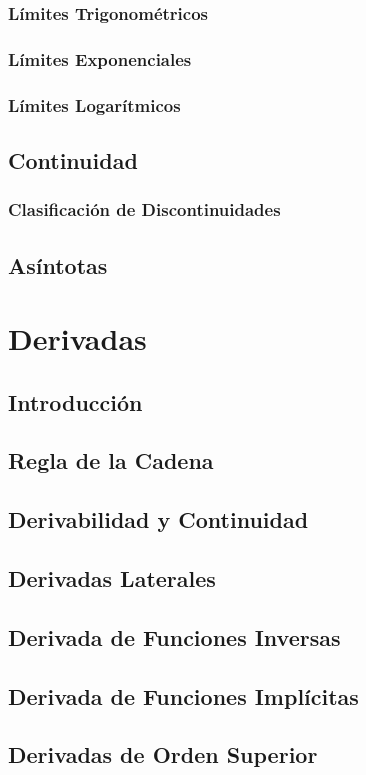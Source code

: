 \documentclass[12pt,a4paper]{book}
\begin{document}
{\subsection{Límites Trigonométricos}
\subsection{Límites Exponenciales}
\subsection{Límites Logarítmicos}
\section{Continuidad}
\subsection{Clasificación de Discontinuidades}
\section{Asíntotas}

\chapter{Derivadas}
\section{Introducción}
\section{Regla de la Cadena}
\section{Derivabilidad y Continuidad}
\section{Derivadas Laterales}
\section{Derivada de Funciones Inversas}
\section{Derivada de Funciones Implícitas}
\section{Derivadas de Orden Superior}
}
\end{document}
